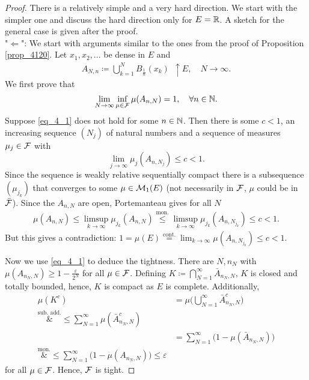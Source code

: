 \begin{proof}[Proof]
	There is a relatively simple and a very hard direction. We start with the simpler one and discuss the hard direction only for $E=\mathbb{R}$. A sketch for the general case is given after the proof.\\
	
	"{}$\Leftarrow$": We start with arguments similar to the ones from the proof of Proposition \ref{prop_4120}. Let $x_1,x_2,...$ be dense in $E$ and 
	\begin{align*}
		A_{N,n} \coloneqq \bigcup_{k=1}^N B_{\frac{1}{n}}(x_k) \:\: \uparrow E,\quad N\to\infty.
	\end{align*}
	We first prove that
	\begin{align}\label{eq_4_1}
		\lim\limits_{N\to\infty} \inf\limits_{\mu\in\mathcal{F}} \mu (A_{n,N}) =1, \quad \forall n\in\mathbb{N}.
	\end{align}
	Suppose \eqref{eq_4_1} does not hold for some $n\in\mathbb{N}$. Then there is some $c<1$, an increasing sequence $(N_j)$ of natural numbers and a sequence of measures $\mu_j \in \mathcal{F}$ with $$\lim_{j\to\infty} \mu_j (A_{n,N_j}) \leq c < 1.$$ Since the sequence is weakly relative sequentially compact there is a subsequence $(\mu_{j_k})$ that converges to some $\mu \in \mathcal{M}_1(E)$ (not necessarily in $\mathcal{F}$, $\mu$ could be in $\bar{\mathcal{F}}$). Since the $A_{n,N}$ are open, Portemanteau gives for all $N$
	\begin{align*}
		\mu(A_{n,N}) \leq \limsup_{k\to\infty}\mu_{j_k}(A_{n,N}) 
			\overset{\text{mon.}}{\leq} \limsup_{k\to\infty} \mu_{j_k}(A_{n,N_{j_k}}) 
			\leq c < 1.
	\end{align*}
	But this gives a contradiction: $1 = \mu(E) \overset{\text{cont.}}{=} \lim_{k\to\infty} \mu (A_{n,N_{j_k}}) \leq c<1$. \smallskip
	
	Now we use \eqref{eq_4_1} to deduce the tightness. There are $N,n_N$ with $\mu(A_{n_N,N}) \geq 1 - \frac{\varepsilon}{2^N}$ for all $\mu \in \mathcal{F}$. Defining $K \coloneqq \bigcap_{N=1}^{\infty} \bar{A}_{n_N,N}$, $K$ is closed and totally bounded, hence, $K$ is compact as $E$ is complete. Additionally,
	\begin{align*}
		\mu(K^c) &= \mu \Big( \bigcup_{N=1}^{\infty} \bar{A}_{n_N,N}^c \Big) \\
			\overset{\text{sub. add.}}&{\leq} \sum_{N=1}^{\infty} \mu ( \bar{A}_{n_N,N}^c) \\
			&= \sum_{N=1}^{\infty} \big( 1 - \mu (\bar{A}_{n_N,N}) \big) \\
			\overset{\text{mon.}}&{\leq} \sum_{N=1}^{\infty} \big( 1 - \mu (A_{n_N,N}) \big) \leq \varepsilon
	\end{align*}
	for all $\mu \in \mathcal{F}$. Hence, $\mathcal{F}$ is tight.\smallskip
	

\end{proof}
